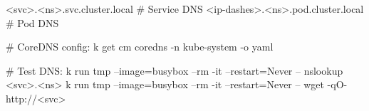 
\begin{cheatcodebash}
<svc>.<ns>.svc.cluster.local        # Service DNS
<ip-dashes>.<ns>.pod.cluster.local  # Pod DNS
\end{cheatcodebash}

\begin{cheatcodebash}
# CoreDNS config:
k get cm coredns -n kube-system -o yaml
\end{cheatcodebash}

\begin{cheatcodebash}
# Test DNS:
k run tmp --image=busybox --rm -it --restart=Never -- nslookup <svc>.<ns>
k run tmp --image=busybox --rm -it --restart=Never -- wget -qO- http://<svc>
\end{cheatcodebash}
